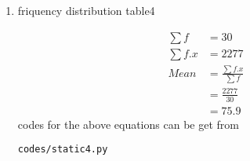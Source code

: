 \renewcommand{\theequation}{\theenumi}
\begin{enumerate}[label=\arabic*.,ref=\thesubsection.\theenumi]
\item \begin{table}[!ht]
	\centering
	
	\caption{friquency distribution table4 }
\end{table}
\begin{align}
\sum{f} &= 30
\\
\sum{f.x} &= 2277
\\
Mean &= \frac{\sum{f.x}}{\sum{f}}
\\ &= \frac{2277}{30}
\\&= 75.9
\end{align}
codes for the above equations can be get from
\begin{lstlisting}
codes/static4.py
\end{lstlisting}
\end{enumerate}